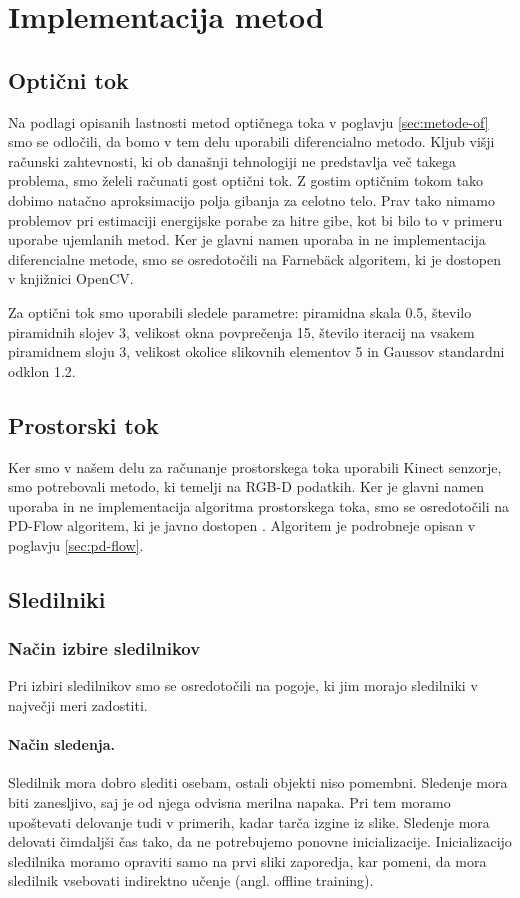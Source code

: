 \section{Implementacija metod}
\subsection{Optični tok}
Na podlagi opisanih lastnosti metod optičnega toka v poglavju \ref{sec:metode-of} smo se odločili, da bomo v tem delu uporabili diferencialno metodo. Kljub višji računski zahtevnosti, ki ob današnji tehnologiji ne predstavlja več takega problema, smo želeli računati gost optični tok. Z gostim optičnim tokom tako dobimo natačno aproksimacijo polja gibanja za celotno telo. Prav tako nimamo problemov pri estimaciji energijske porabe za hitre gibe, kot bi bilo to v primeru uporabe ujemlanih metod. Ker je glavni namen uporaba in ne implementacija diferencialne metode, smo se osredotočili na Farneb{\"a}ck algoritem, ki je dostopen v knjižnici OpenCV.

Za optični tok smo uporabili sledele parametre: piramidna skala \num{0.5}, število piramidnih slojev \num{3}, velikost okna povprečenja \num{15}, število iteracij na vsakem piramidnem sloju \num{3}, velikost okolice slikovnih elementov \num{5} in Gaussov standardni odklon \num{1.2}.

\subsection{Prostorski tok}
Ker smo v našem delu za računanje prostorskega toka uporabili Kinect senzorje, smo potrebovali metodo, ki temelji na RGB-D podatkih. Ker je glavni namen uporaba in ne implementacija algoritma prostorskega toka, smo se osredotočili na PD-Flow algoritem, ki je javno dostopen \cite{jaimez2015primal}. Algoritem je podrobneje opisan v poglavju \ref{sec:pd-flow}.

\subsection{Sledilniki}
\subsubsection{Način izbire sledilnikov}\label{sec:pogoji-sledilnikov}
Pri izbiri sledilnikov smo se osredotočili na pogoje, ki jim morajo sledilniki v največji meri zadostiti.

\paragraph{Način sledenja.} Sledilnik mora dobro slediti osebam, ostali objekti niso pomembni. Sledenje mora biti zanesljivo, saj je od njega odvisna merilna napaka. Pri tem moramo upoštevati delovanje tudi v primerih, kadar tarča izgine iz slike. Sledenje mora delovati čimdaljši čas tako, da ne potrebujemo ponovne inicializacije. Inicializacijo sledilnika moramo opraviti samo na prvi sliki zaporedja, kar pomeni, da mora sledilnik vsebovati indirektno učenje (angl. offline training).


